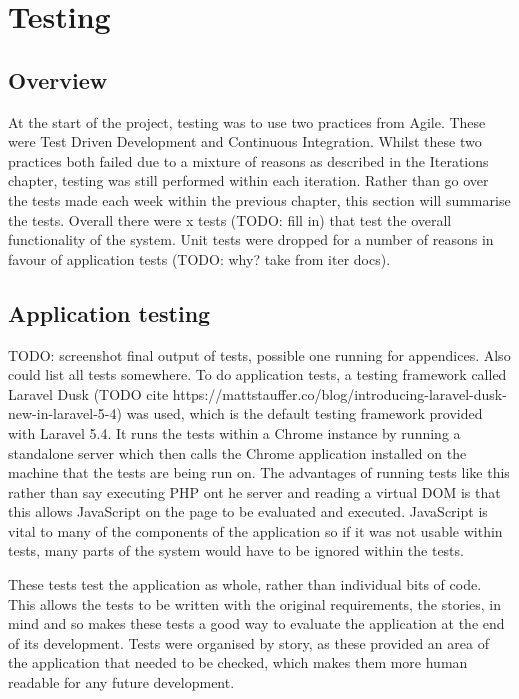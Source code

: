 \chapter{Testing}

\section{Overview}
At the start of the project, testing was to use two practices from Agile. These were Test Driven Development and Continuous Integration. Whilst these two practices both failed due to a mixture of reasons as described in the Iterations chapter, testing was still performed within each iteration. Rather than go over the tests made each week within the previous chapter, this section will summarise the tests. Overall there were x tests (TODO: fill in) that test the overall functionality of the system. Unit tests were dropped for a number of reasons in favour of application tests (TODO: why? take from iter docs).

\section{Application testing}
TODO: screenshot final output of tests, possible one running for appendices. Also could list all tests somewhere.
To do application tests, a testing framework called Laravel Dusk (TODO cite https://mattstauffer.co/blog/introducing-laravel-dusk-new-in-laravel-5-4) was used, which is the default testing framework provided with Laravel 5.4. It runs the tests within a Chrome instance by running a standalone server which then calls the Chrome application installed on the machine that the tests are being run on. The advantages of running tests like this rather than say executing PHP ont he server and reading a virtual DOM is that this allows JavaScript on the page to be evaluated and executed. JavaScript is vital to many of the components of the application so if it was not usable within tests, many parts of the system would have to be ignored within the tests.

These tests test the application as whole, rather than individual bits of code. This allows the tests to be written with the original requirements, the stories, in mind and so makes these tests a good way to evaluate the application at the end of its development. Tests were organised by story, as these provided an area of the application that needed to be checked, which makes them more human readable for any future development.


